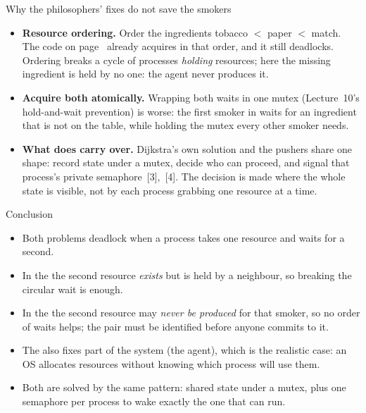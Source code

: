 \documentclass[aspectratio=169,11pt]{beamer}
\begin{document}
\begin{frame}{Why the philosophers' fixes do not save the smokers}
  \small
  \begin{itemize}
    \item \textbf{Resource ordering.} Order the ingredients
          tobacco $<$ paper $<$ match. The code on page~\pageref{naive} already acquires
          in that order, and it still deadlocks. Ordering breaks a cycle of
          processes \emph{holding} resources; here the missing ingredient is
          held by no one: the agent never produces it.
    \item \textbf{Acquire both atomically.} Wrapping both waits in one
          mutex (Lecture~10's hold-and-wait prevention) is worse: the first
          smoker in waits for an ingredient that is not on the table, while
          holding the mutex every other smoker needs.
    \item \textbf{What does carry over.} Dijkstra's own solution and the
          pushers share one shape: record state under a mutex, decide who
          can proceed, and signal that process's private semaphore~[3],~[4].
          The decision is made where the whole state is visible, not by each
          process grabbing one resource at a time.
  \end{itemize}
\end{frame}

\begin{frame}{Conclusion}
  \small
  \begin{itemize}
    \item Both problems deadlock when a process takes one resource and waits
          for a second.
    \item In the \Dph{} the second resource \emph{exists} but is held by a
          neighbour, so breaking the circular wait is enough.
    \item In the \Smk{} the second resource may \emph{never be produced} for
          that smoker, so no order of waits helps; the pair must be identified
          before anyone commits to it.
    \item The \Smk{} also fixes part of the system (the agent), which is the
          realistic case: an OS allocates resources without knowing which
          process will use them.
    \item Both are solved by the same pattern: shared state under a mutex,
          plus one semaphore per process to wake exactly the one that can run.
  \end{itemize}
\end{frame}
\end{document}
